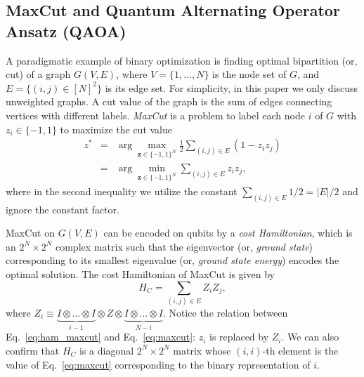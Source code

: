 \documentclass[conference,10pt]{IEEEtran}
\begin{document}
\subsection{MaxCut and Quantum Alternating Operator Ansatz (QAOA)}
A paradigmatic example of binary optimization is finding optimal bipartition (or, cut) of a graph $G(V,E)$, where $V = \{1,\ldots, N\}$ is the node set of $G$, and $E = \{(i,j) \in [N]^2\}$ is its edge set. For simplicity, in this paper we only discuss unweighted graphs. A cut value of the graph is the sum of edges connecting vertices with different labels. \emph{MaxCut} is a problem to label each node $i$ of $G$ with $z_i \in \{-1, 1\}$ to maximize the cut value 
\begin{eqnarray}
    z^* &=& \arg\max_{\bm{z} \in \{-1,1\}^N}  \frac{1}{2}\sum_{(i,j) \in E} \left(1 - z_i z_j \right) \nonumber \\
        &=&  \arg\min_{\bm{z} \in \{-1,1\}^N}
    \sum_{(i,j) \in E} z_i z_j, \label{eq:maxcut}
\end{eqnarray}
where in the second inequality we utilize the constant $\sum_{(i,j) \in E} 1/2 = |E|/2$ and ignore the constant factor. 

MaxCut on $G(V,E)$ can be encoded on qubits
by a
\emph{cost Hamiltonian}, which is 
an $2^N\times 2^N$ complex matrix such that the eigenvector (or, \emph{ground state}) corresponding to its smallest eigenvalue (or, \emph{ground state energy}) encodes the optimal solution. The cost Hamiltonian of MaxCut is given by  
\begin{equation}
    H_{C} = \sum_{(i,j) \in E} Z_i Z_j,\label{eq:ham_maxcut}
\end{equation}
where $Z_i \equiv \underbrace{I\otimes \ldots \otimes I}_{i-1}\otimes Z \otimes \underbrace{I \otimes \ldots \otimes I}_{N-i}$. Notice the relation between Eq.~\eqref{eq:ham_maxcut} and Eq.~\eqref{eq:maxcut}: $z_i$ is replaced by $Z_i$.
We can also confirm that $H_{C}$ is a diagonal $2^N\times 2^N$ matrix whose $(i,i)$-th element is the value of Eq.~\eqref{eq:maxcut} corresponding to the binary representation of $i$. 
\end{document}
